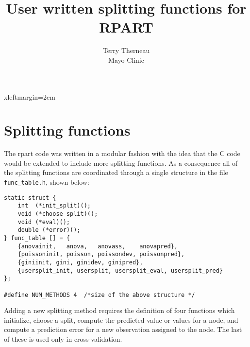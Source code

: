 
\addtolength{\textwidth}{1in}
\addtolength{\oddsidemargin}{-.5in}
\setlength{\evensidemargin}{\oddsidemargin}

\Rcodeplaceholder{}

 {xleftmargin=2em}
\renewenvironment{Schunk}{\vspace{\topsep}}{\vspace{\topsep}}

\newcommand{\myfig}[1]{\resizebox{\textwidth}{!}
                        {\texttt{[image: \#1.pdf]}}}
\title{User written splitting functions for RPART}
\author{Terry Therneau \\Mayo Clinic}

\maketitle

\Rcodeplaceholder{}

\section{Splitting functions}
The rpart code was written in a modular fashion with the idea that the C
code would be extended to include more splitting functions.
As a consequence all of the splitting functions are coordinated through a
single structure in the file \texttt{func\_table.h}, shown below:
\begin{verbatim}
static struct {
    int  (*init_split)();
    void (*choose_split)();
    void (*eval)();
    double (*error)();
} func_table [] = {
    {anovainit,   anova,   anovass,    anovapred},
    {poissoninit, poisson, poissondev, poissonpred},
    {giniinit, gini, ginidev, ginipred},
    {usersplit_init, usersplit, usersplit_eval, usersplit_pred}
};

#define NUM_METHODS 4  /*size of the above structure */
\end{verbatim}
Adding a new splitting method requires the definition of four functions which
initialize, choose a split, compute the predicted value or values for a node,
and
compute a prediction error for a new observation assigned to the node.
The last of these is used only in cross-validation.

